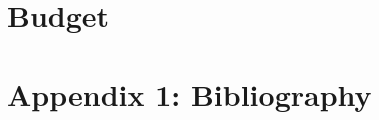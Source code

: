 \documentclass{article}[11pt]
\begin{document}


\clearpage
\section{Budget}



\singlespacing

\section{Appendix 1: Bibliography}
\end{document}
